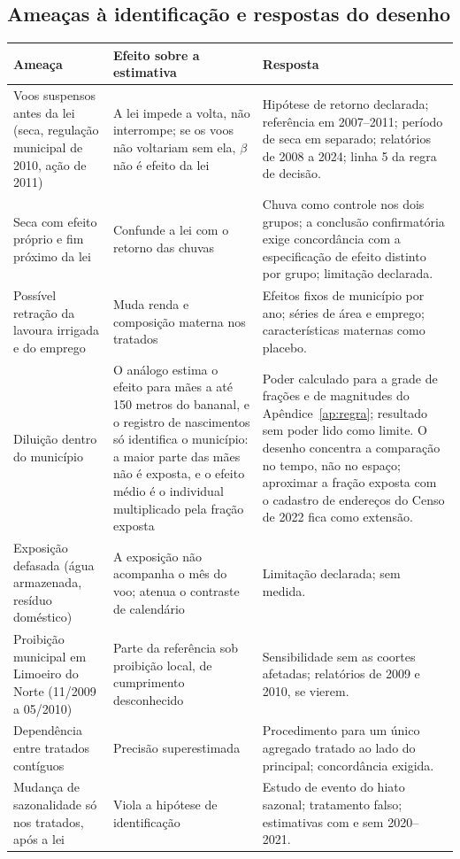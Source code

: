 \begin{apendicesenv}
\clearpage
\chapter{Ameaças à identificação e respostas do desenho}
\label{ap:ameacas}

\begin{quadro}[htb]
\caption{\label{qua:ameacas}Ameaças à identificação e respostas do desenho}
\centering
\footnotesize
\begin{tabular}{@{}p{3.6cm}p{4.7cm}p{6.2cm}@{}}
\toprule
Ameaça & Efeito sobre a estimativa & Resposta \\
\midrule
Voos suspensos antes da lei (seca, regulação municipal de 2010, ação de 2011) &
A lei impede a volta, não interrompe; se os voos não voltariam sem ela, $\beta$ não é efeito da lei &
Hipótese de retorno declarada; referência em 2007--2011; período de seca em separado; relatórios de 2008 a 2024; linha 5 da regra de decisão. \\
Seca com efeito próprio e fim próximo da lei &
Confunde a lei com o retorno das chuvas &
Chuva como controle nos dois grupos; a conclusão confirmatória exige concordância com a especificação de efeito distinto por grupo; limitação declarada. \\
Possível retração da lavoura irrigada e do emprego &
Muda renda e composição materna nos tratados &
Efeitos fixos de município por ano; séries de área e emprego; características maternas como placebo. \\
Diluição dentro do município &
O análogo estima o efeito para mães a até 150 metros do bananal, e o registro de nascimentos só identifica o município: a maior parte das mães não é exposta, e o efeito médio é o individual multiplicado pela fração exposta &
Poder calculado para a grade de frações e de magnitudes do Apêndice~\ref{ap:regra}; resultado sem poder lido como limite. O desenho concentra a comparação no tempo, não no espaço; aproximar a fração exposta com o cadastro de endereços do Censo de 2022 fica como extensão. \\
Exposição defasada (água armazenada, resíduo doméstico) &
A exposição não acompanha o mês do voo; atenua o contraste de calendário &
Limitação declarada; sem medida. \\
Proibição municipal em Limoeiro do Norte (11/2009 a 05/2010) &
Parte da referência sob proibição local, de cumprimento desconhecido &
Sensibilidade sem as coortes afetadas; relatórios de 2009 e 2010, se vierem. \\
Dependência entre tratados contíguos &
Precisão superestimada &
Procedimento para um único agregado tratado ao lado do principal; concordância exigida. \\
Mudança de sazonalidade só nos tratados, após a lei &
Viola a hipótese de identificação &
Estudo de evento do hiato sazonal; tratamento falso; estimativas com e sem 2020--2021. \\
\bottomrule
\end{tabular}
\end{quadro}


\end{apendicesenv}
